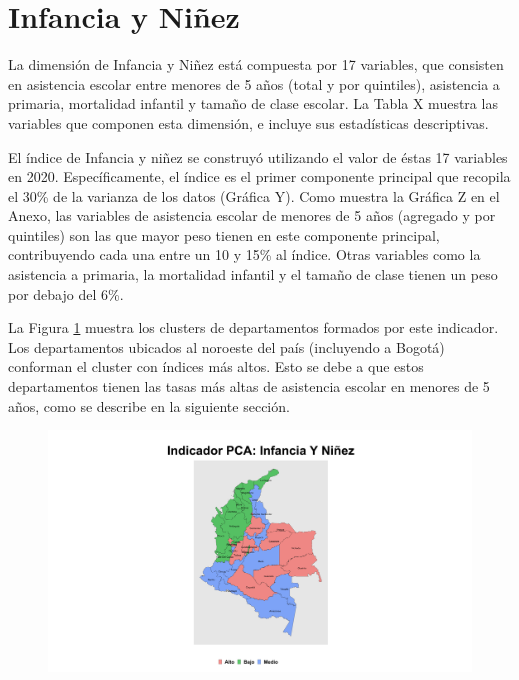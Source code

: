 
\section{Infancia y Niñez}

        La dimensión de Infancia y Niñez está compuesta por 17 variables, que consisten en asistencia escolar entre menores de 5 años (total y por quintiles), asistencia a primaria, mortalidad infantil y tamaño de clase escolar. La Tabla X muestra las variables que componen esta dimensión, e incluye sus estadísticas descriptivas.
        
        El índice de Infancia y niñez se construyó utilizando el valor de éstas 17 variables en 2020. Específicamente, el índice es el primer componente principal que recopila el 30\% de la varianza de los datos (Gráfica Y). Como muestra la Gráfica Z en el Anexo, las variables de asistencia escolar de menores de 5 años (agregado y por quintiles) son las que mayor peso tienen en este componente principal, contribuyendo cada una entre un 10 y 15\% al índice. Otras variables como la asistencia a primaria, la mortalidad infantil y el tamaño de clase tienen un peso por debajo del 6\%.
        
        La Figura \ref{pca_infancia_y_ninez} muestra los clusters de departamentos formados por este indicador. Los departamentos ubicados al noroeste del país (incluyendo a Bogotá) conforman el cluster con índices más altos. Esto se debe a que estos departamentos tienen las tasas más altas de asistencia escolar en menores de 5 años, como se describe en la siguiente sección.  
        
        \begin{figure}[H]
        \caption[Indicador Pulso Social sobre Infancia y Niñez]{\label{pca_infancia_y_ninez} }
        \begin{center}
        \includegraphics[width=\textwidth,keepaspectratio]{pca_clusters/pca_infancia_y_ninez_pca.png}
        \end{center}
    \end{figure}
    
